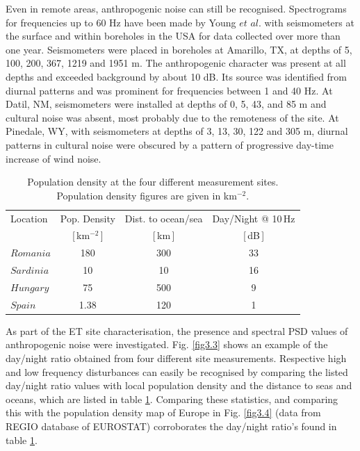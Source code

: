 Even in remote areas, anthropogenic noise can still be recognised. Spectrograms for frequencies up to 60 Hz have been made by Young $et$ $al.$ \cite{Young1996} with seismometers at the surface and within boreholes in the USA for data collected over more than one year. Seismometers were placed in boreholes at Amarillo, TX, at depths of 5, 100, 200, 367, 1219 and 1951 m. The anthropogenic character was present at all depths and exceeded background by about 10 dB. Its source was identified from diurnal patterns and was prominent for frequencies between 1 and 40 Hz. At Datil, NM, seismometers were installed at depths of 0, 5, 43, and 85 m and cultural noise was absent, most probably due to the remoteness of the site. At Pinedale, WY, with seismometers at depths of 3, 13, 30, 122 and 305 m, diurnal patterns in cultural noise were obscured by a pattern of progressive day-time increase of wind noise. 
\begin{table}[h] 
		\centering      %
		\caption{Population density at the four different measurement sites. Population density figures are given in km$^{-2}$.} 
		\setlength{\tabcolsep}{10pt} 
			\begin{tabular}{l c c c}  %
			\hline\hline                        %
			Location & Pop. Density & Dist. to ocean/sea & Day/Night @ 10\,Hz \\  %
			& [\,km$^{-2}$\,] & [\,km\,] & [\,dB\,] \\ [0.5ex]
			\hline                    %
			$Romania$ & 180 & 300 & 33  \\   %
			$Sardinia$ & 10 & 10 & 16 \\ 
			$Hungary$ & 75 & 500 & 9 \\        %
			$Spain$ & 1.38 & 120& 1 \\ [1ex]       %
			\hline     %
			\end{tabular} 
		\label{PopDens}
\end{table} 

As part of the ET site characterisation, the presence and spectral PSD values of anthropogenic noise were investigated. Fig. \ref{fig3.3} shows an example of the day/night ratio obtained from four different site measurements. Respective high and low frequency disturbances can easily be recognised by comparing the listed day/night ratio values with local population density and the distance to seas and oceans, which are listed in table \ref{PopDens}. Comparing these statistics, and comparing this with the population density map of Europe in Fig. \ref{fig3.4} (data from REGIO database of EUROSTAT) corroborates the day/night ratio's found in table \ref{PopDens}. 



